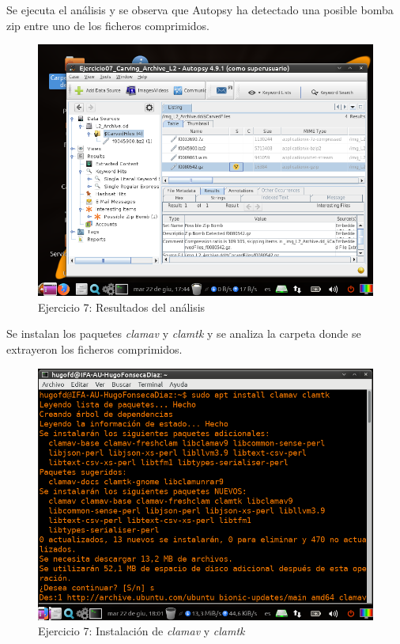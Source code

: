 \documentclass[11pt]{article}
\begin{document}
Se ejecuta el análisis y se observa que Autopsy ha detectado una posible bomba zip entre uno de los ficheros comprimidos.

\begin{figure}[H]
    \caption{Ejercicio 7: Resultados del análisis}
    \centering
    \includegraphics[scale=0.7]{e7-5.png}
\end{figure}

Se instalan los paquetes \textit{clamav} y \textit{clamtk} y se analiza la carpeta donde se extrayeron los ficheros comprimidos.

\begin{figure}[H]
    \caption{Ejercicio 7: Instalación de \textit{clamav} y \textit{clamtk}}
    \centering
    \includegraphics[scale=0.7]{e7-6.png}
\end{figure}
\end{document}

